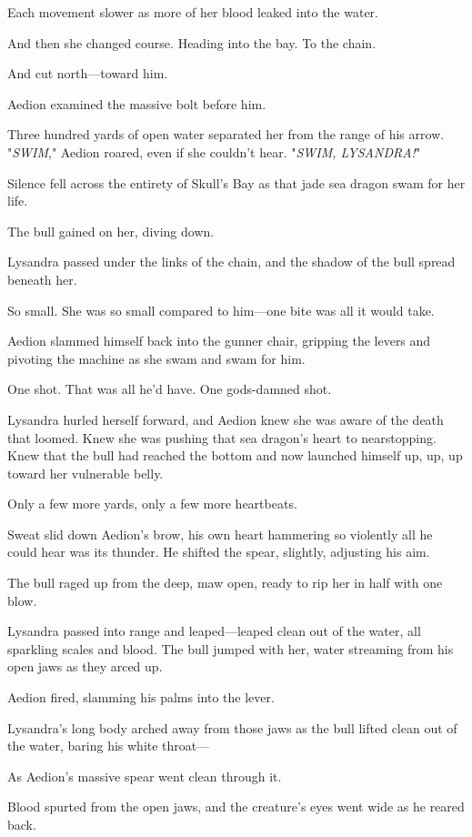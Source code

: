 Each movement slower as more of her blood leaked into the water.

And then she changed course. Heading into the bay. To the chain.

And cut north---toward him.

Aedion examined the massive bolt before him.

Three hundred yards of open water separated her from the range of his arrow. "\emph{SWIM}," Aedion roared, even if she couldn't hear. "\emph{SWIM, LYSANDRA!}"

Silence fell across the entirety of Skull's Bay as that jade sea dragon swam for her life.

The bull gained on her, diving down.

Lysandra passed under the links of the chain, and the shadow of the bull spread beneath her.

So small. She was so small compared to him---one bite was all it would take.

Aedion slammed himself back into the gunner chair, gripping the levers and pivoting the machine as she swam and swam for him.

One shot. That was all he'd have. One gods-damned shot.

Lysandra hurled herself forward, and Aedion knew she was aware of the death that loomed. Knew she was pushing that sea dragon's heart to nearstopping. Knew that the bull had reached the bottom and now launched himself up, up, up toward her vulnerable belly.

Only a few more yards, only a few more heartbeats.

Sweat slid down Aedion's brow, his own heart hammering so violently all he could hear was its thunder. He shifted the spear, slightly, adjusting his aim.

The bull raged up from the deep, maw open, ready to rip her in half with one blow.

Lysandra passed into range and leaped---leaped clean out of the water, all sparkling scales and blood. The bull jumped with her, water streaming from his open jaws as they arced up.

Aedion fired, slamming his palms into the lever.

Lysandra's long body arched away from those jaws as the bull lifted clean out of the water, baring his white throat---

As Aedion's massive spear went clean through it.

Blood spurted from the open jaws, and the creature's eyes went wide as he reared back.

